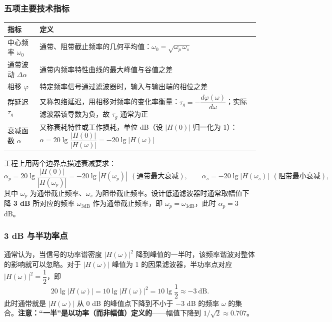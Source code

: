 \subsubsection{五项主要技术指标}
\begin{center}
\renewcommand{\arraystretch}{1.3}
\small
\begin{tabular}{p{2.4cm}p{11.4cm}}
\toprule
指标 & 定义 \\
\midrule
中心频率 $\omega_0$ & 通带、阻带截止频率的几何平均值：$\omega_0=\sqrt{\omega_p\,\omega_s}$ \\
通带波动 $\Delta\alpha$ & 通带内频率特性曲线的最大峰值与谷值之差 \\
相移 $\varphi$ & 特定频率信号通过滤波器时，输入与输出端的相位之差 \\
群延迟 $\tau_g$ & 又称包络延迟，用相移对频率的变化率衡量：$\tau_g=-\dfrac{d\varphi(\omega)}{d\omega}$；实际滤波器该导数为负，故 $\tau_g$ 通常为正 \\
衰减函数 $\alpha$ & 又称衰耗特性或工作损耗，单位 dB（设 $|H(0)|$ 归一化为 1）：$\alpha=20\lg\dfrac{|H(0)|}{|H(\omega)|}=-20\lg|H(\omega)|$ \\
\bottomrule
\end{tabular}
\end{center}

工程上用两个边界点描述衰减要求：
\begin{equation}
\alpha_p=20\lg\frac{|H(0)|}{|H(\omega_p)|}=-20\lg|H(\omega_p)|\ \ (\text{通带最大衰减}),\qquad
\alpha_s=-20\lg|H(\omega_s)|\ \ (\text{阻带最小衰减}),
\end{equation}
其中 $\omega_p$ 为通带截止频率、$\omega_s$ 为阻带截止频率。设计低通滤波器时通常取幅值下降 \textbf{3 dB} 所对应的频率 $\omega_{3\text{dB}}$ 作为通带截止频率，即 $\omega_p=\omega_{3\text{dB}}$，此时 $\alpha_p=3$ dB。

\subsubsection{3 dB 与半功率点}
通常认为，当信号的功率谱密度 $|H(\omega)|^2$ 降到峰值的一半时，该频率谐波对整体的影响就可以忽略。对于 $|H(\omega)|$ 峰值为 1 的因果滤波器，半功率点对应 $|H(\omega)|^2=\dfrac{1}{2}$，即
\begin{equation}
20\lg|H(\omega)|=10\lg|H(\omega)|^2=10\lg\frac{1}{2}\approx-3\ \text{dB}.
\end{equation}
此时通带就是 $|H(\omega)|$ 从 0 dB 的峰值点下降到不小于 $-3$ dB 的频率 $\omega$ 的集合。\textbf{注意：“一半”是以功率（而非幅值）定义的}——幅值下降到 $1/\sqrt{2}\approx0.707$。

